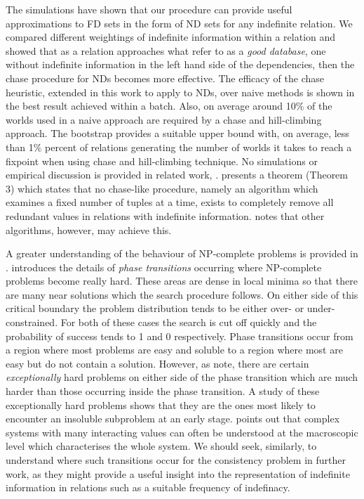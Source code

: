 The simulations have shown that our procedure can provide useful
approximations to FD sets in the form of ND sets for any indefinite
relation. We compared different weightings of indefinite information within
a relation and showed that as a relation approaches what \cite{vn95}
refer to as a {\em good database}, one without indefinite information
in the left hand side of the dependencies, then the chase procedure for
NDs becomes more effective. The efficacy of the chase heuristic, extended in
this work to apply to NDs, over naive methods is shown in the
best result achieved within a batch. Also, on average around 10\% of 
the worlds used in 
a naive approach are required by a chase and hill-climbing approach.
The bootstrap provides a suitable upper bound with, on average, 
less than 1\% percent of relations generating the number of worlds it
takes to reach a fixpoint when using chase and hill-climbing technique.
No simulations or empirical discussion is provided in related work,
\cite{vn95,inv91}. \cite{imi91} presents a theorem (Theorem 3) which
states that no chase-like procedure, namely an algorithm which
examines a fixed number of tuples at a time, exists to completely
remove all redundant values in relations with indefinite
information. \cite{vn95} notes that other algorithms, however, may
achieve this.

\medskip
{}
A greater understanding of the behaviour of NP-complete problems
is provided in \cite{slm92,msl92}.  \cite{ckt91} introduces
the details of {\em phase transitions} occurring where NP-complete
problems become really hard.  These areas are dense in local
minima so that there are many near solutions which the search procedure
follows.  On either side of this critical boundary the 
problem distribution tends to be either over- or under- constrained.
For both of these cases the search is cut off quickly and the 
probability of success tends to 1 and 0 respectively. Phase
transitions  occur from a region where
most problems are easy and soluble to a region where most are
easy but do not contain a solution. However, as \cite{sg94} note, there are
certain {\em exceptionally} hard problems on either side
of the phase transition which are much harder than those occurring
inside the phase transition. A study of these exceptionally
hard problems shows that they are the ones most likely to
encounter an insoluble subproblem at an early stage. \cite{ckt91}
points out that complex systems with many
interacting values can often be understood at the
macroscopic level which characterises the whole system.
We should seek, similarly, 
to understand where such transitions occur for the consistency
problem in further work, as they might provide a useful insight into
the representation of indefinite information in relations such as a
suitable frequency of indefinacy.

